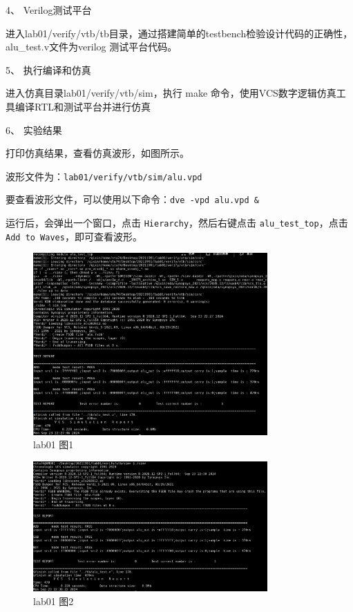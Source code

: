 4、	Verilog测试平台

进入lab01/verify/vtb/tb目录，通过搭建简单的testbench检验设计代码的正确性，alu\_test.v文件为verilog 测试平台代码。

5、	执行编译和仿真

进入仿真目录lab01/verify/vtb/sim，执行 make 命令，使用VCS数字逻辑仿真工具编译RTL和测试平台并进行仿真

6、	实验结果

打印仿真结果，查看仿真波形，如图所示。

波形文件为：\texttt{lab01/verify/vtb/sim/alu.vpd}

要查看波形文件，可以使用以下命令：\texttt{dve -vpd alu.vpd \&}

运行后，会弹出一个窗口，点击 \texttt{Hierarchy}，然后右键点击 \texttt{alu\_test\_top}，点击 \texttt{Add to Waves}，即可查看波形。

\begin{figure}[H]
  \centering
  \includegraphics[width=0.8\textwidth]{images/lab01-01.png}
  \caption{lab01 图1}
\end{figure}

\begin{figure}[H]
    \centering
    \includegraphics[width=0.8\textwidth]{images/lab01-02.png}
    \caption{lab01 图2}
  \end{figure}

